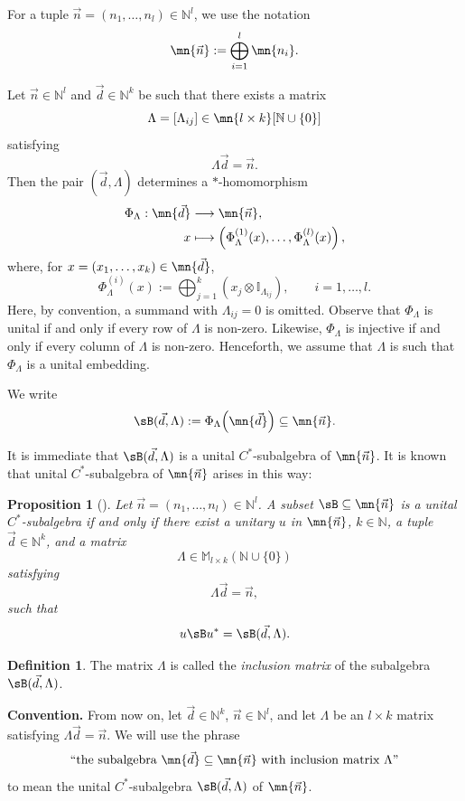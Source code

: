 \documentclass[12pt,a4paper]{amsart}
\theoremstyle{plain}
\newtheorem{prop}[theorem]{Proposition}
\theoremstyle{definition}
\newtheorem{definition}[theorem]{Definition}
\theoremstyle{remark}
\numberwithin{equation}{section}
\theoremstyle{ser}
\theoremstyle{serr}
\theoremstyle{ser}
\theoremstyle{ser}
\theoremstyle{collabquestion}
\newcommand{\N}{\mathbb{N}}
\newcommand{\<}{\langle}
\renewcommand{\>}{\rangle}
\begin{document}
For a tuple $\Vec{n}=(n_1,\dots,n_l)\in\N^l$, we use the notation
\[
\mn{\Vec{n}}
:=
\bigoplus_{i=1}^l \mn{n_i}.
\]

Let $\Vec{n}\in\N^l$ and $\Vec{d}\in\N^k$ be such that there exists a matrix
\[
\Lambda=[\Lambda_{ij}]\in \mn{l\times k}[\N\cup\{0\}]
\]
satisfying
\[
\Lambda\Vec{d}=\Vec{n}.
\]
Then the pair $(\Vec{d},\Lambda)$ determines a $*$-homomorphism
\begin{align*}
\Phi_\Lambda:\mn{\Vec{d}}&\longrightarrow \mn{\Vec{n}},\\
x&\longmapsto
\left(\Phi_\Lambda^{(1)}(x),\dots,\Phi_\Lambda^{(l)}(x)\right),
\end{align*}
where, for $x=(x_1,\dots,x_k)\in\mn{\Vec{d}}$,
\[
\Phi_\Lambda^{(i)}(x)
:=
\bigoplus_{j=1}^k
\left(x_j\otimes \mathbb{I}_{\Lambda_{ij}}\right),
\qquad i=1,\dots,l.
\]
Here, by convention, a summand with $\Lambda_{ij}=0$ is omitted. Observe that $\Phi_\Lambda$ is unital if and only if every row of $\Lambda$ is non-zero. Likewise, $\Phi_\Lambda$ is injective if and only if every column of $\Lambda$ is non-zero. Henceforth, we assume that $\Lambda$ is such that $\Phi_\Lambda$ is a unital embedding.

We write
\[
\sB(\Vec{d},\Lambda)
:=
\Phi_\Lambda\!\left(\mn{\Vec{d}}\right)
\subseteq
\mn{\Vec{n}}.
\]

It is immediate that $\sB(\Vec{d},\Lambda)$ is a unital $C^*$-subalgebra of $\mn{\Vec{n}}$. It is known that unital $C^*$-subalgebra of $\mn{\Vec{n}}$ arises in this way:

\begin{prop}[\cite{davidson_book}]\label{prop:subalg_of_fin_dim_alg}
Let $\Vec{n}=(n_1,\dots,n_l)\in\N^l$. A subset
$
\sB\subseteq\mn{\Vec{n}}
$
is a unital $C^*$-subalgebra if and only if there exist a unitary $u$ in $\mn{\vec{n}}$, $k\in\N$, a tuple $\Vec{d}\in\N^k$, and a matrix
\[
\Lambda\in\mathbb{M}_{l\times k}(\N\cup\{0\})
\]
satisfying
\[
\Lambda\Vec{d}=\Vec{n},
\]
such that
\[
u\sB u^*=\sB(\Vec{d},\Lambda).
\]
\end{prop}

\begin{definition}
    The matrix $\Lambda$ is called the \emph{inclusion matrix} of the subalgebra $\sB(\Vec{d}, \Lambda)$.
\end{definition}

\noindent\textbf{Convention.} From now on, let $\vec{d}\in \N^k$, $\vec{n}\in \N^l$, and let $\Lambda$ be an $l \times k$ matrix satisfying $\Lambda \vec{d}=\vec{n}$. We will use the phrase
\[
``\text{the subalgebra }\mn{\vec{d}} \subseteq \mn{\vec{n}} \text{ with inclusion matrix } \Lambda"
\]
to mean the unital $C^*$-subalgebra $\sB(\vec{d}, \Lambda)$ of $\mn{\vec{n}}$.
\end{document}

